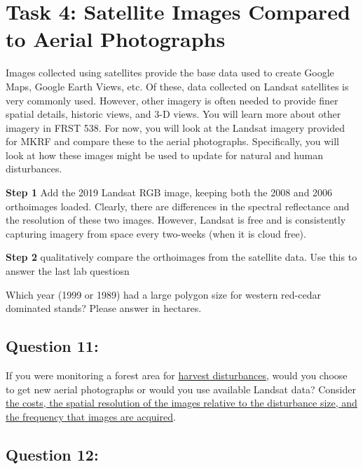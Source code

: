 \documentclass[
  letterpaper,
]{book}
\begin{document}
\hypertarget{task-4-satellite-images-compared-to-aerial-photographs}{%
\section*{Task 4: Satellite Images Compared to Aerial
Photographs}\label{task-4-satellite-images-compared-to-aerial-photographs}}


Images collected using satellites provide the base data used to create
Google Maps, Google Earth Views, etc. Of these, data collected on
Landsat satellites is very commonly used. However, other imagery is
often needed to provide finer spatial details, historic views, and 3-D
views. You will learn more about other imagery in FRST 538. For now, you
will look at the Landsat imagery provided for MKRF and compare these to
the aerial photographs. Specifically, you will look at how these images
might be used to update for natural and human disturbances.

\textbf{Step 1} Add the 2019 Landsat RGB image, keeping both the 2008
and 2006 orthoimages loaded. Clearly, there are differences in the
spectral reflectance and the resolution of these two images. However,
Landsat is free and is consistently capturing imagery from space every
two-weeks (when it is cloud free).

\textbf{Step 2} qualitatively compare the orthoimages from the satellite
data. Use this to answer the last lab questiosn

Which year (1999 or 1989) had a large polygon size for western red-cedar
dominated stands? Please answer in hectares.

\hypertarget{question-11-1}{%
\subsection*{Question 11:}\label{question-11-1}}

If you were monitoring a forest area for \ul{harvest disturbances},
would you choose to get new aerial photographs or would you use
available Landsat data? Consider \ul{the costs, the spatial resolution
of the images relative to the disturbance size, and the frequency that
images are acquired}.

\hypertarget{question-12-1}{%
\subsection*{Question 12:}\label{question-12-1}}
\end{document}
